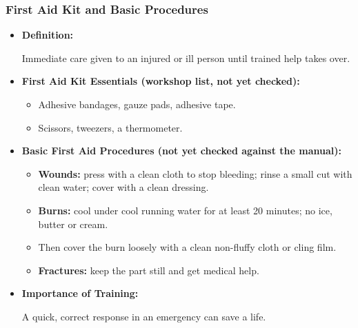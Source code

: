 \begin{frame}[fragile,shrink=6]\frametitle{First Aid Kit and Basic Procedures}

      \begin{itemize}
        \item \textbf{Definition:} 
        
        Immediate care given to an injured or ill person until trained help takes over.

        \item \textbf{First Aid Kit Essentials (workshop list, not yet checked):}
        \begin{itemize}
            \item Adhesive bandages, gauze pads, adhesive tape.
            \item Scissors, tweezers, a thermometer.
        \end{itemize}
        \item \textbf{Basic First Aid Procedures (not yet checked against the manual):}
        \begin{itemize}
            \item \textbf{Wounds:} press with a clean cloth to stop bleeding; rinse a small cut with clean water; cover with a clean dressing.
            \item \textbf{Burns:} cool under cool running water for at least 20 minutes; no ice, butter or cream.
            \item Then cover the burn loosely with a clean non-fluffy cloth or cling film.
            \item \textbf{Fractures:} keep the part still and get medical help.
        \end{itemize}
        \item \textbf{Importance of Training:}

        A quick, correct response in an emergency can save a life.
        
      \end{itemize}

\end{frame}

